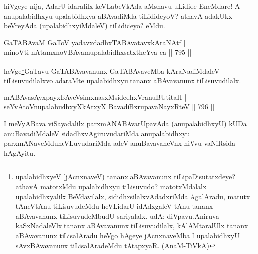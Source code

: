 \begin{artha}
hiVgeye nija, AdarU idaralilx keVLabeVkAda aMshavu uLidide EneMdare! A anupalabidhxyu upalabidhxya aBAvadiMda tiLidideyoV? athavA adakUkx beVreyAda (upalabidhxyiMdaleV) tiLidideyo? eMdu.
\end{artha}


\begin{shl}
GaTABAvaM GaToV yadavxdadhxTABAvatavxkAraNAtf | \\
minoVti nA\s \s tamxnoV\s BAvamupalabidhxsatxtheYva ca \hfill||  795 ||  
\end{shl}

\begin{artha}
heVge\footnote{upalabidhxyeV (jAcnxnaveV) tananx aBAvavanunx tiLipaDisutatxdeye? athavA matotxMdu upalabidhxyu tiLisuvudo? matotxMdalalx upalabidhxyalilx BeVdavilalx, sididhxsilalxvAdadxriMda AgalAradu, matutx tAneVtAnu tiLisuvudeMdu heVLidarU idAdxgaleV tAnu tananx aBAvavanunx tiLisuvudeMbudU sariyalalx. udA:-diVpavutAniruva kaSxNadaleVlx tananx aBAvavanunx tiLisuvudilalx, kAlAMtaralUlx tananx aBAvavanunx tiLisalAradu heVgo hAgeye jAcnxnaveMba I upalabidhxyU sAvxBAvavanunx tiLisalAradeMdu tAtapxyaR. (AnaM-TiVkA)}GaTavu GaTABAvavanunx GaTABAvaveMba kAraNadiMdaleV tiLisuvudilalxvo adaraMte upalabidhxyu tananx aBAvavanunx tiLisuvudilalx.
\end{artha}

\begin{shl}
\footnotemark[1]mABAvasAyxpayxBAveV\s simxnasxMsidedhxVranuBUtitaH | \\
seYvAtoV\s nupalabudhxyXkAtxyX BavadiBxrupavaNayxRteV \hfill||  796 ||  
\end{shl}

\begin{artha}
I meVyABava viSayadalilx parxmANABAvarUpavAda (anupalabidhxyU) kUDa anuBavadiMdaleV sidadhxvAgiruvudariMda anupalabidhxyu parxmANaveMduheVLuvudariMda adeV anuBavavaneVnx niVvu vaNiRsida hAgAyitu.
\end{artha}

